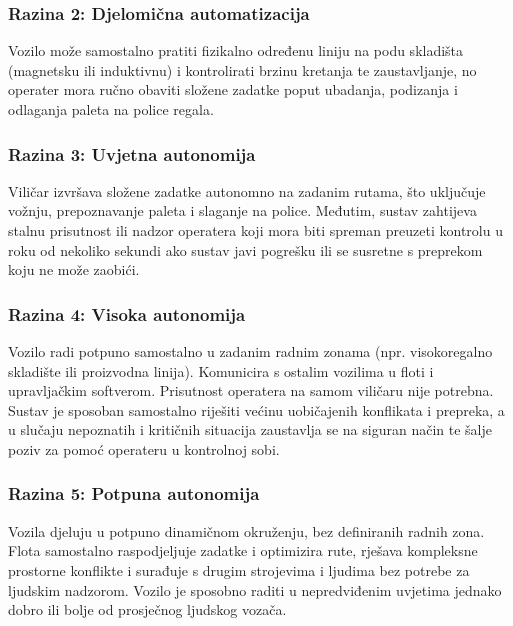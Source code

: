 \subsubsection{Razina 2: Djelomična automatizacija}
Vozilo može samostalno pratiti fizikalno određenu liniju na podu skladišta (magnetsku ili induktivnu) i kontrolirati brzinu kretanja te zaustavljanje, no operater mora ručno obaviti složene zadatke poput ubadanja, podizanja i odlaganja paleta na police regala.

\subsubsection{Razina 3: Uvjetna autonomija}
Viličar izvršava složene zadatke autonomno na zadanim rutama, što uključuje vožnju, prepoznavanje paleta i slaganje na police. Međutim, sustav zahtijeva stalnu prisutnost ili nadzor operatera koji mora biti spreman preuzeti kontrolu u roku od nekoliko sekundi ako sustav javi pogrešku ili se susretne s preprekom koju ne može zaobići.

\subsubsection{Razina 4: Visoka autonomija}
Vozilo radi potpuno samostalno u zadanim radnim zonama (npr. visokoregalno skladište ili proizvodna linija). Komunicira s ostalim vozilima u floti i upravljačkim softverom. Prisutnost operatera na samom viličaru nije potrebna. Sustav je sposoban samostalno riješiti većinu uobičajenih konflikata i prepreka, a u slučaju nepoznatih i kritičnih situacija zaustavlja se na siguran način te šalje poziv za pomoć operateru u kontrolnoj sobi.

\subsubsection{Razina 5: Potpuna autonomija}
Vozila djeluju u potpuno dinamičnom okruženju, bez definiranih radnih zona. Flota samostalno raspodjeljuje zadatke i optimizira rute, rješava kompleksne prostorne konflikte i surađuje s drugim strojevima i ljudima bez potrebe za ljudskim nadzorom. Vozilo je sposobno raditi u nepredviđenim uvjetima jednako dobro ili bolje od prosječnog ljudskog vozača.

